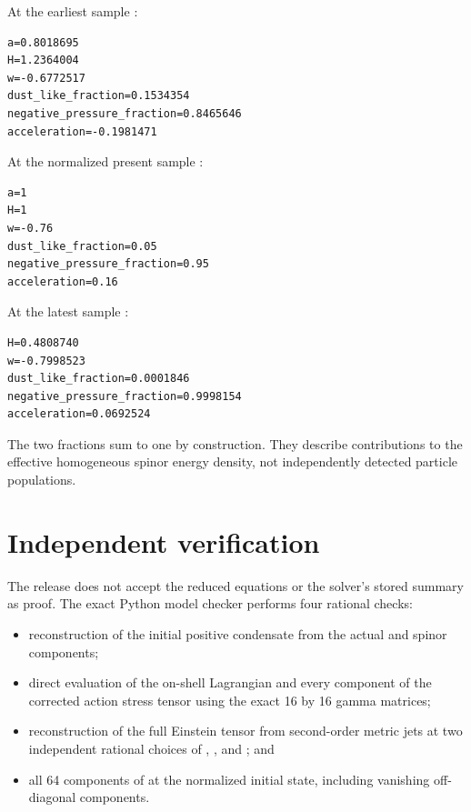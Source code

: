 \documentclass[11pt]{article}
\begin{document}
At the earliest sample \texttt{}:

\begin{Verbatim}[fontsize=\small]
a=0.8018695
H=1.2364004
w=-0.6772517
dust_like_fraction=0.1534354
negative_pressure_fraction=0.8465646
acceleration=-0.1981471
\end{Verbatim}

At the normalized present sample \texttt{}:

\begin{Verbatim}[fontsize=\small]
a=1
H=1
w=-0.76
dust_like_fraction=0.05
negative_pressure_fraction=0.95
acceleration=0.16
\end{Verbatim}

At the latest sample \texttt{}:

\begin{Verbatim}[fontsize=\small]
H=0.4808740
w=-0.7998523
dust_like_fraction=0.0001846
negative_pressure_fraction=0.9998154
acceleration=0.0692524
\end{Verbatim}

The two fractions sum to one by construction. They describe contributions to the effective homogeneous spinor energy density, not independently detected particle populations.

\section{Independent verification}

The release does not accept the reduced equations or the solver's stored summary as proof. The exact Python model checker performs four rational checks:

\begin{itemize}
\item reconstruction of the initial positive condensate from the actual \texttt{} and
spinor components;

\item direct evaluation of the on-shell Lagrangian and every component of the
corrected action stress tensor using the exact 16 by 16 gamma matrices;

\item reconstruction of the full Einstein tensor from second-order metric jets at
two independent rational choices of \texttt{}, \texttt{}, and \texttt{}; and

\item all 64 components of \texttt{} at the normalized initial state,
including vanishing off-diagonal components.

\end{itemize}
\end{document}
